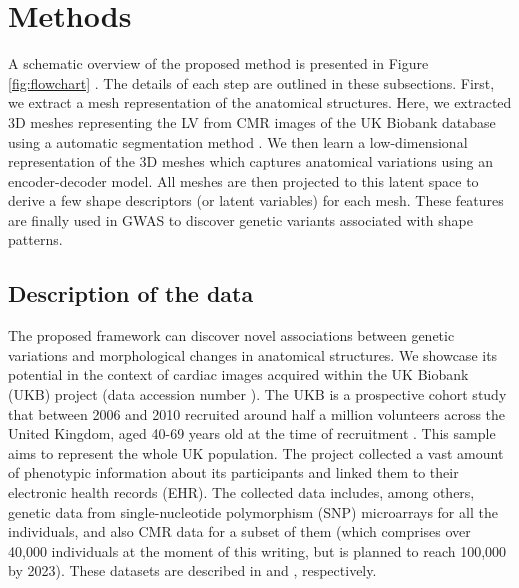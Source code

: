 \section{Methods}
 A schematic overview of the proposed method is presented in Figure \ref{fig:flowchart} . The details of each step are outlined in these subsections. First, we extract a mesh representation of the anatomical structures. Here, we extracted 3D meshes representing the LV from CMR images of the UK Biobank database using a automatic segmentation method \cite{ref_rahman}. We then learn a low-dimensional representation of the 3D meshes which captures anatomical variations using an encoder-decoder model. All meshes are then projected to this latent space to derive a few shape descriptors (or latent variables) for each mesh. These features are finally used in GWAS to discover genetic variants associated with shape patterns. 

\subsection{Description of the data}
The proposed framework can discover novel associations between genetic variations and morphological changes in anatomical structures. We showcase its potential in the context of cardiac images acquired within the UK Biobank (UKB) project (data accession number \ACCESSIONNUMBER). The UKB is a prospective cohort study that between 2006 and 2010 recruited around half a million volunteers across the United Kingdom, aged 40-69 years old at the time of recruitment \cite{ref_ukbb}. This sample aims to represent the whole UK population. The project collected a vast amount of phenotypic information about its participants and linked them to their electronic health records (EHR). The collected data includes, among others, genetic data from single-nucleotide polymorphism (SNP) microarrays for all the individuals, and also CMR data for a subset of them (which comprises over 40,000 individuals at the moment of this writing, but is planned to reach 100,000 by 2023). These datasets are described in \cite{ref_ukbb_genetics} and \cite{ref_ukbb_cmr}, respectively.


